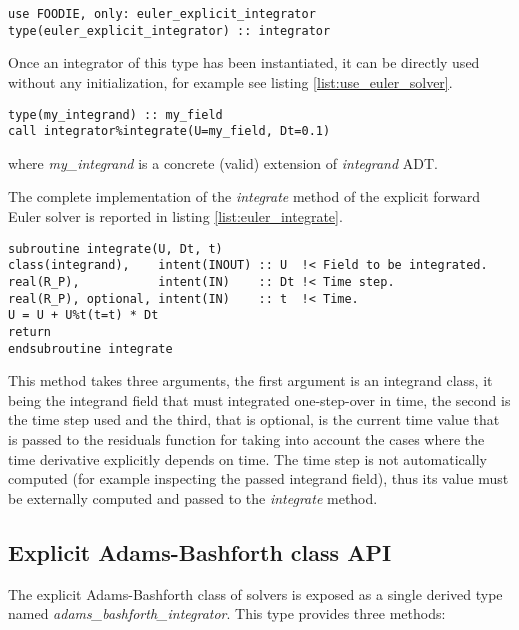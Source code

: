 \begin{lstlisting}[firstnumber=1,style=code,caption={definition of an explicit forward Euler integrator},label={list:define_euler_solver}]
use FOODIE, only: euler_explicit_integrator
type(euler_explicit_integrator) :: integrator
\end{lstlisting}

Once an integrator of this type has been instantiated, it can be directly used without any initialization, for example see listing \ref{list:use_euler_solver}.

\begin{lstlisting}[firstnumber=1,style=code,caption={example of usage of an explicit forward Euler integrator},label={list:use_euler_solver}]
type(my_integrand) :: my_field
call integrator%integrate(U=my_field, Dt=0.1)
\end{lstlisting}
where \emph{my\_integrand} is a concrete (valid) extension of \emph{integrand} ADT.

The complete implementation of the \emph{integrate} method of the explicit forward Euler solver is reported in listing \ref{list:euler_integrate}.

\begin{lstlisting}[firstnumber=1,style=code,caption={implementation of the \emph{integrate} method of Euler solver},label={list:euler_integrate}]
subroutine integrate(U, Dt, t)
class(integrand),    intent(INOUT) :: U  !< Field to be integrated.
real(R_P),           intent(IN)    :: Dt !< Time step.
real(R_P), optional, intent(IN)    :: t  !< Time.
U = U + U%t(t=t) * Dt
return
endsubroutine integrate
\end{lstlisting}
This method takes three arguments, the first argument is an integrand class, it being the integrand field that must integrated one-step-over in time, the second is the time step used and the third, that is optional, is the current time value that is passed to the residuals function for taking into account the cases where the time derivative explicitly depends on time. The time step is not automatically computed (for example inspecting the passed integrand field), thus its value must be externally computed and passed to the \emph{integrate} method.

\subsection{Explicit Adams-Bashforth class API}\label{subsec:solver_ab}

The explicit Adams-Bashforth class of solvers is exposed as a single derived type named \emph{adams\_bashforth\_integrator}. This type provides three methods:

